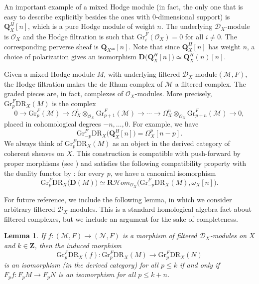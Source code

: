 \documentclass[11pt]{article}
\numberwithin{equation}{section}
\newcommand{\DXmodule}{$\cD_X$\nobreakdash-mod\-ule\xspace}
\newcommand{\DXmodules}{$\cD_X$\nobreakdash-mod\-ules\xspace}
\theoremstyle{plain}
\newtheorem{lem}[thm]{Lemma}
\theoremstyle{definition}
\newcommand\Z{{\mathbf Z}}
\newcommand\Q{{\mathbf Q}}
\newcommand\R{{\mathbf R}}
\newcommand\cD{\mathcal{D}}
\newcommand\cH{\mathcal{H}}
\newcommand\cO{\mathcal{O}}
\newcommand\cM{\mathcal{M}}
\newcommand\cN{\mathcal{N}}
\newcommand\cH{\mathcal{H}}
\newcommand\cO{\mathcal{O}}
\newcommand\gr{\mathrm{Gr}}
\newcommand\DR{\mathrm{DR}}
\renewcommand{\SS}{SS}
\begin{document}
An important example of a mixed Hodge module (in fact, the only one that is easy to describe explicitly besides the ones with $0$-dimensional support) is $\Q_X^H[n]$, which is a pure Hodge module of weight $n$.
The underlying \DXmodule is $\cO_X$ and the Hodge filtration is such that $\gr^F_i(\cO_X)=0$ for all $i\neq 0$. The corresponding perverse sheaf is $\Q_{X^\mathrm{an}}[n]$.
Note that since $\Q_X^H[n]$ has weight $n$, a choice of polarization gives an isomorphism ${\mathbf D}(\Q_X^H[n]\big)\simeq\Q_X^H(n)[n]$.

Given a mixed Hodge module $M$, with underlying filtered \DXmodule $(\cM,F)$, the Hodge filtration makes the de Rham complex of $\cM$ a filtered complex. The graded pieces
are, in fact, complexes of $\cO_X$-modules. More precisely, $\gr_p^F\DR_X(M)$ is the complex
\[0\to \gr_p^F(\cM)\to\Omega_X^1\otimes_{\cO_X}\gr_{p+1}^F(\cM)\to \cdots\to \Omega_X^n\otimes_{\cO_X}\gr_{p+n}^F(\cM)\to 0,\]
placed in cohomological degrees $-n,\ldots,0$. For example, we have
\[\gr_{-p}^F\DR_X\big(\Q_X^H[n]\big)=\Omega_X^p[n-p].\]
We always think of $\gr^F_p\DR_X(M)$ as an object in the derived category of coherent sheaves on $X$.
This construction is compatible with push-forward by proper morphisms (see \cite[\S 2.3.7]{Saito_MHP}) and satisfies the following compatibility property with the duality functor
by \cite[\SS 2.4.5 \& 2.4.11]{Saito_MHP}: for every $p$, we have a canonical isomorphism
\begin{equation}\label{eq_compat_with_duality}
\gr^F_p\DR_X\big({\mathbf D}(M)\big)\simeq \R\cH om_{\cO_X}\big(\gr^F_{-p}\DR_X(M),\omega_X[n]\big).
\end{equation}

For future reference, we include the following lemma, in which we consider arbitrary filtered \DXmodules. This is a standard homological algebra fact
about filtered complexes, but we include an argument for the sake of completeness.

\begin{lem}\label{general_lemma}
If $f\colon (\cM,F)\to (\cN,F)$
is a morphism of filtered \DXmodules on $X$ and $k\in\Z$, then the induced morphism
\[\gr^F_p\DR_X(f)\colon \gr^F_p\DR_X(M)\to \gr^F_p\DR_X(N)\] is an isomorphism (in the derived category) for all $p\leq k$
if and only if $F_pf\colon F_pM\to F_pN$ is an isomorphism for all $p\leq k+n$.
\end{lem}
\end{document}
